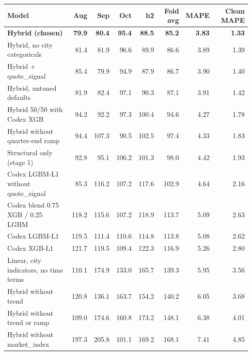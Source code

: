 \begin{tabular}{@{}lrrrrrrr@{}}
\toprule
\textbf{Model} & \textbf{Aug} & \textbf{Sep} & \textbf{Oct} & \textbf{h2} & \textbf{Fold avg} & \textbf{MAPE} & \textbf{Clean MAPE} \\
\midrule
\rowcolor{chosen}
\textbf{Hybrid (chosen)} & \textbf{79.9} & \textbf{80.4} & \textbf{95.4} & \textbf{88.5} & \textbf{85.2} & \textbf{3.83} & \textbf{1.33} \\
Hybrid, no city categoricals & 81.4 & 81.9 & 96.6 & 89.9 & 86.6 & 3.89 & 1.39 \\
Hybrid + quote\_signal & 85.4 & 79.9 & 94.9 & 87.9 & 86.7 & 3.90 & 1.40 \\
Hybrid, untuned defaults & 81.9 & 82.4 & 97.1 & 90.3 & 87.1 & 3.91 & 1.42 \\
Hybrid 50/50 with Codex XGB & 94.2 & 92.2 & 97.3 & 100.4 & 94.6 & 4.27 & 1.78 \\
Hybrid without quarter-end ramp & 94.4 & 107.3 & 90.5 & 102.5 & 97.4 & 4.33 & 1.83 \\
Structural only (stage 1) & 92.8 & 95.1 & 106.2 & 101.3 & 98.0 & 4.42 & 1.93 \\
Codex LGBM-L1 without quote\_signal & 85.3 & 116.2 & 107.2 & 117.6 & 102.9 & 4.64 & 2.16 \\
Codex blend 0.75 XGB / 0.25 LGBM & 118.2 & 115.6 & 107.2 & 118.9 & 113.7 & 5.09 & 2.63 \\
Codex LGBM-L1 & 119.5 & 111.4 & 110.6 & 114.8 & 113.8 & 5.08 & 2.62 \\
Codex XGB-L1 & 121.7 & 119.5 & 109.4 & 122.3 & 116.9 & 5.26 & 2.80 \\
Linear, city indicators, no time terms & 110.1 & 174.9 & 133.0 & 165.7 & 139.3 & 5.95 & 3.56 \\
Hybrid without trend & 120.8 & 136.1 & 163.7 & 154.2 & 140.2 & 6.05 & 3.68 \\
Hybrid without trend or ramp & 109.0 & 174.6 & 160.8 & 173.2 & 148.1 & 6.38 & 4.01 \\
Hybrid without market\_index & 197.3 & 205.8 & 101.1 & 169.2 & 168.1 & 7.41 & 4.85 \\
\bottomrule
\end{tabular}
